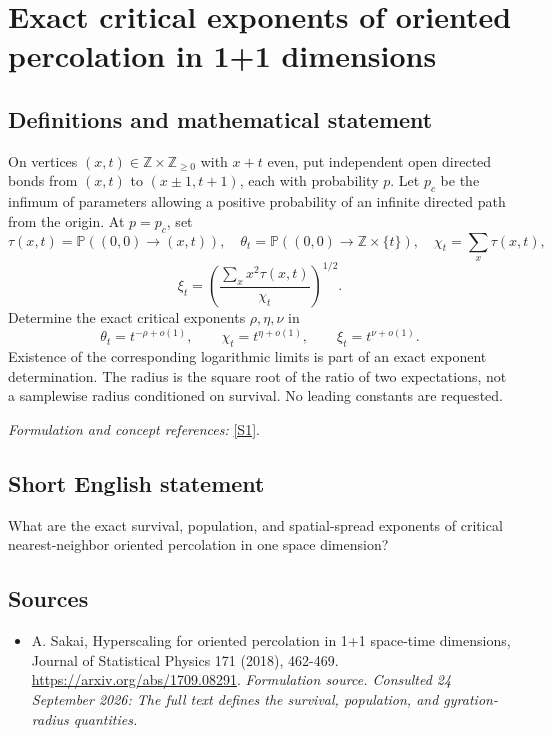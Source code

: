 \documentclass[11pt]{article}
\begin{document}
\section*{\texorpdfstring{Exact critical exponents of oriented percolation in 1+1 dimensions}{Exact critical exponents of oriented percolation in 1+1 dimensions}}\label{30006949}
\subsection{Definitions and mathematical statement}
On vertices $(x,t)\in{\mathbb{Z}}\times{\mathbb{Z}}_{\ge0}$ with $x+t$ even, put independent open directed bonds from $(x,t)$ to $(x\pm1,t+1)$, each with probability $p$. Let $p_c$ be the infimum of parameters allowing a positive probability of an infinite directed path from the origin. At $p=p_c$, set
\[
 \tau(x,t)={\mathbb{P}}((0,0)\to(x,t)),\quad
 \theta_t={\mathbb{P}}((0,0)\to{\mathbb{Z}}\times\{t\}),\quad
 \chi_t=\sum_x\tau(x,t),
\]
\[
 \xi_t=\left(\frac{\sum_xx^2\tau(x,t)}{\chi_t}\right)^{1/2}.
\]
Determine the exact critical exponents $\rho,\eta,\nu$ in
\[
 \theta_t=t^{-\rho+o(1)},\qquad
 \chi_t=t^{\eta+o(1)},\qquad \xi_t=t^{\nu+o(1)}.
\]
Existence of the corresponding logarithmic limits is part of an exact exponent determination. The radius is the square root of the ratio of two expectations, not a samplewise radius conditioned on survival. No leading constants are requested.
\par\smallskip\textit{Formulation and concept references:} \href{https://arxiv.org/abs/1709.08291}{[S1]}.

\subsection{Short English statement}
What are the exact survival, population, and spatial-spread exponents of critical nearest-neighbor oriented percolation in one space dimension?
\subsection{Sources}
\begin{itemize}
\item[S1]A. Sakai, Hyperscaling for oriented percolation in 1+1 space-time dimensions, Journal of Statistical Physics 171 (2018), 462-469.
\url{https://arxiv.org/abs/1709.08291}.
\textit{Formulation source. Consulted 24 September 2026: The full text defines the survival, population, and gyration-radius quantities.}
\end{itemize}
\end{document}
